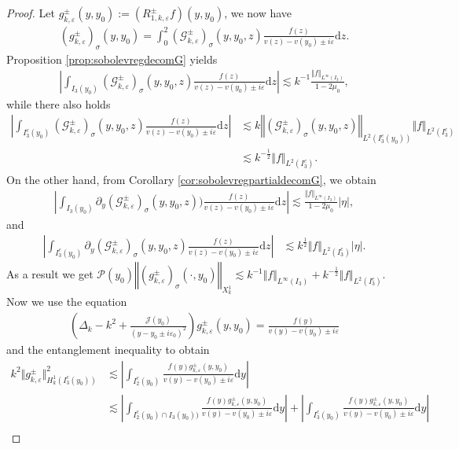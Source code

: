 \documentclass[11pt,reqno]{amsproc}
\theoremstyle{definition}
\numberwithin{equation}{section}
\newcommand{\G}{{\mathcal{G}}}
\newcommand{\cJ}{{\mathcal{J}}}
\newcommand{\D}{{\Delta}}
\newcommand{\uv}{{0}}
\newcommand{\ov}{{2}}
\renewcommand{\d}{\mathrm{d}}
\newcommand{\ep}{\varepsilon}
\renewcommand{\P}{{\mathcal{P}}}
\begin{document}
\begin{proof}
Let $g_{k,\ep}^\pm(y,y_0):= (R_{1,k,\ep}^\pm f)(y,y_0)$, we now have
\begin{align*}
\left( g_{k,\ep}^\pm \right)_{\sigma}(y,y_0) = \int_\uv ^ \ov \left( \G_{k,\ep}^\pm\right)_\sigma(y,y_0,z) \frac{f(z)}{v(z)-v(y_0)\pm i\ep} \d z. 
\end{align*}
Proposition \ref{prop:sobolevregdecomG} yields
\begin{align*}
\left| \int_{I_3(y_0)} \left( \G_{k,\ep}^\pm\right)_\sigma(y,y_0,z)  \frac{f(z)}{v(z)-v(y_0) \pm i\ep} \d z \right| \lesssim k^{-1}\frac{ \Vert f \Vert_{L^\infty(I_3)}}{1-2\mu_0},
\end{align*}
while there also holds
\begin{align*}
\left| \int_{I_3^c(y_0)} \left( \G_{k,\ep}^\pm\right)_\sigma(y,y_0,z) \frac{f(z)}{v(z)-v(y_0) \pm i\ep} \d z \right| &\lesssim k  \left\Vert \left( \G_{k,\ep}^\pm\right)_\sigma(y,y_0,z) \right\Vert_{L^2(I_3^c(y_0))} \Vert f \Vert_{L^2(I_3^c)} \\
&\lesssim k^{-\frac12}\Vert f \Vert_{L^2(I_3^c)}.
\end{align*}
On the other hand, from Corollary \ref{cor:sobolevregpartialdecomG}, we obtain
\begin{align*}
\left| \int_{I_3(y_0)} \partial_y\left( \G_{k,\ep}^\pm\right)_\sigma(y,y_0,z)) \frac{f(z)}{v(z)-v(y_0) \pm i\ep} \d z \right| \lesssim \frac{\Vert f \Vert_{L^\infty(I_3)}}{1-2\mu_0}|\eta|,
\end{align*}
and
\begin{align*}
\left| \int_{I_3^c(y_0)} \partial_y \left( \G_{k,\ep}^\pm\right)_\sigma(y,y_0,z) \frac{f(z)}{v(z)-v(y_0) \pm i\ep} \d z \right| &\lesssim k^\frac12\Vert f \Vert_{L^2(I_3^c)}|\eta|.
\end{align*}
As a result we get $\P(y_0)\left \Vert \left( g_{k,\ep}^\pm \right)_{\sigma}(\cdot,y_0)\right\Vert_{X_k^1}\lesssim k^{-1} \Vert f \Vert_{L^\infty(I_3)} + k^{-\frac12}\Vert f \Vert_{L^2(I_3^c)} $. Now we use the equation
\begin{align*}
\left( \D_k - k^2 + \frac{\cJ(y_0)}{(y-y_0\pm i\ep_0)^2} \right) g_{k,\ep}^\pm(y,y_0) = \frac{f(y)}{v(y)-v(y_0)\pm i\ep}
\end{align*}
and the entanglement inequality to obtain
\begin{align*}
k^2\Vert g_{k,\ep}^\pm \Vert_{H^1_k(I_3^c(y_0))}^2 &\lesssim \left| \int_{I_2^c(y_0)} \frac{f(y)g_{k,\ep}^\pm(y,y_0)}{v(y)-v(y_0)\pm i\ep} \d y \right| \\
&\lesssim \left| \int_{I_2^c(y_0)\cap I_3(y_0))} \frac{f(y)g_{k,\ep}^\pm(y,y_0)}{v(y)-v(y_0)\pm i\ep} \d y \right| + \left| \int_{I_3^c(y_0)} \frac{f(y)g_{k,\ep}^\pm(y,y_0)}{v(y)-v(y_0)\pm i\ep} \d y \right| \\

\end{align*}
\end{proof}
\end{document}
